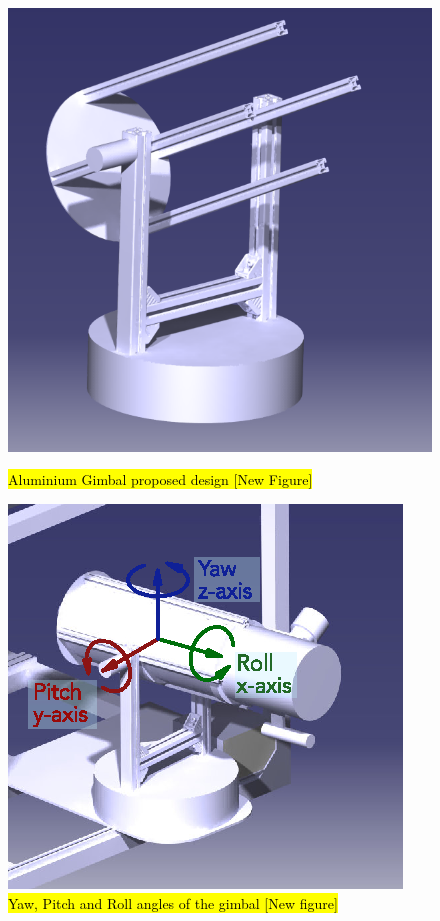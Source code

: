 \begin{figure}[h]
	\centering
	\begin{minipage}[t]{0.4\linewidth}
		\centering
		\includegraphics[width=\linewidth]{4-experiment-design/img/mechanical/Aluminium_Gimbal1.png}
		\caption{\hl{Aluminium Gimbal proposed design [New Figure]}}
		\label{fig::mechanical::AlGim}
	\end{minipage}
	\hspace{0.1\linewidth}
	\begin{minipage}[t]{0.4\linewidth}
		\centering
		\includegraphics[width=\linewidth]{4-experiment-design/img/software/Yaw_Pitch_Roll.eps}
	\caption{\hl{Yaw, Pitch and Roll angles of the gimbal [New figure]}}
	\label{fig::software::Yaw_Pitch_Roll}
	\end{minipage}


\end{figure}
